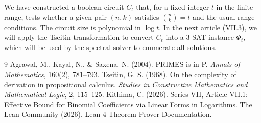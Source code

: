 \documentclass[11pt,a4paper]{article}
\begin{document}
We have constructed a boolean circuit \(C_t\) that, for a fixed integer \(t\) in the finite range, tests whether a given pair \((n,k)\) satisfies \(\binom{n}{k}=t\) and the usual range conditions. The circuit size is polynomial in \(\log t\). In the next article (VII.3), we will apply the Tseitin transformation to convert \(C_t\) into a 3‑SAT instance \(\Phi_t\), which will be used by the spectral solver to enumerate all solutions.


\begin{thebibliography}{9}
  Agrawal, M., Kayal, N., \& Saxena, N. (2004). PRIMES is in P. \emph{Annals of Mathematics}, 160(2), 781–793.
  Tseitin, G. S. (1968). On the complexity of derivation in propositional calculus. \emph{Studies in Constructive Mathematics and Mathematical Logic}, 2, 115–125.
  Kithima, C. (2026). Series VII, Article VII.1: Effective Bound for Binomial Coefficients via Linear Forms in Logarithms.
  The Lean Community (2026). Lean 4 Theorem Prover Documentation.
\end{thebibliography}
\end{document}

